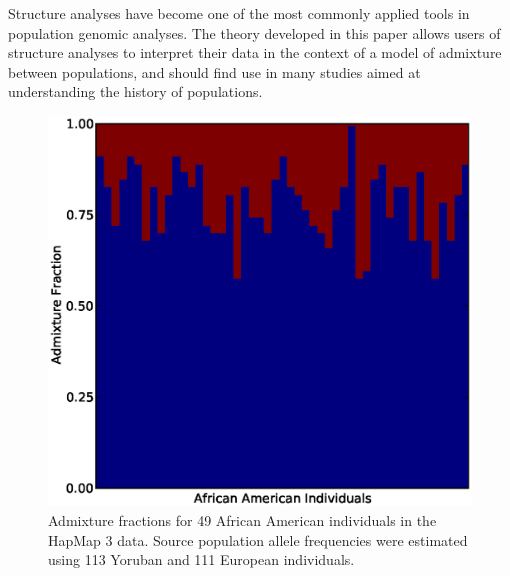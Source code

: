 \documentclass[11pt]{amsart}
\begin{document}
Structure analyses have become one of the most commonly applied tools in population genomic analyses.  The theory developed in this paper allows users of structure analyses to interpret their data in the context of a model of admixture between populations, and should find use in many studies aimed at understanding the history of populations.




\newpage
\begin{figure}[htp!]
  \begin{center}
    \includegraphics[scale=.6]{afr_hap_map.eps}
    \caption{Admixture fractions for 49 African American individuals in the HapMap 3 data. 
    Source population allele frequencies were estimated using 113 Yoruban and 111 European individuals.}
    \label{structure_plot}
  \end{center}
\end{figure}
\end{document}
